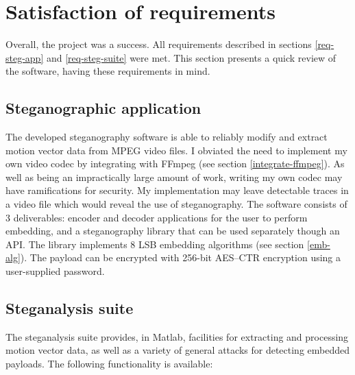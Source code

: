 \documentclass[12pt,british,twoside,notitlepage,usenames,dvipsnames,hypens,final]{report}
\numberwithin{equation}{section}
\numberwithin{figure}{section}
\begin{document}
\section{Satisfaction of requirements}

Overall, the project was a success. All requirements described in sections \ref{req-steg-app} and \ref{req-steg-suite} were met. This section presents a quick review of the software, having these requirements in mind.

\subsection{Steganographic application}

The developed steganography software is able to reliably modify and extract motion vector data from MPEG video files. I obviated the need to implement my own video codec by integrating with FFmpeg (see section \ref{integrate-ffmpeg}). As well as being an impractically large amount of work, writing my own codec may have ramifications for security. My implementation may leave detectable traces in a video file which would reveal the use of steganography. The software consists of 3 deliverables: encoder and decoder applications for the user to perform embedding, and a steganography library that can be used separately though an API. The library implements 8 LSB embedding algorithms (see section \ref{emb-alg}). The payload can be encrypted with 256-bit AES--CTR encryption using a user-supplied password. 

\subsection{Steganalysis suite}

The steganalysis suite provides, in Matlab, facilities for extracting and processing motion vector data, as well as a variety of general attacks for detecting embedded payloads. The following functionality is available:
\end{document}
